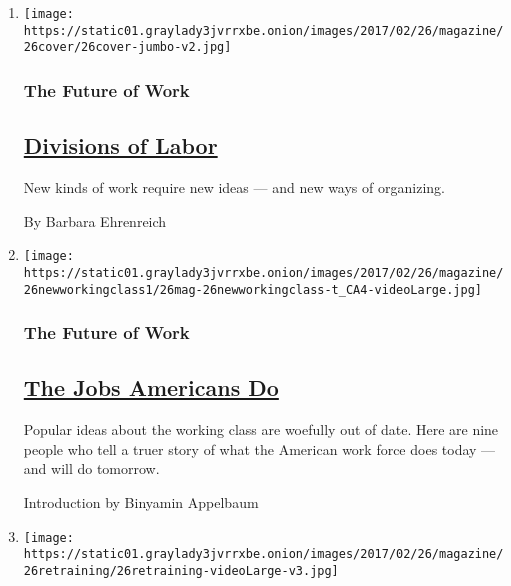 \begin{enumerate}
\def\labelenumi{\arabic{enumi}.}
\item
  \texttt{[image: https://static01.graylady3jvrrxbe.onion/images/2017/02/26/magazine/26cover/26cover-jumbo-v2.jpg]}

  \hypertarget{the-future-of-work}{%
  \subsubsection{The Future of Work}\label{the-future-of-work}}

  \hypertarget{divisions-of-labor}{%
  \subsection{\texorpdfstring{\href{/2017/02/23/magazine/american-working-class-future.html}{Divisions
  of Labor}}{Divisions of Labor}}\label{divisions-of-labor}}

  New kinds of work require new ideas --- and new ways of organizing.

  By Barbara Ehrenreich
\item
  \texttt{[image: https://static01.graylady3jvrrxbe.onion/images/2017/02/26/magazine/26newworkingclass1/26mag-26newworkingclass-t\_CA4-videoLarge.jpg]}

  \hypertarget{the-future-of-work-1}{%
  \subsubsection{The Future of Work}\label{the-future-of-work-1}}

  \hypertarget{the-jobs-americans-do}{%
  \subsection{\texorpdfstring{\href{/2017/02/23/magazine/the-new-working-class.html}{The
  Jobs Americans
  Do}}{The Jobs Americans Do}}\label{the-jobs-americans-do}}

  Popular ideas about the working class are woefully out of date. Here
  are nine people who tell a truer story of what the American work force
  does today --- and will do tomorrow.

  Introduction by Binyamin Appelbaum
\item
  \texttt{[image: https://static01.graylady3jvrrxbe.onion/images/2017/02/26/magazine/26retraining/26retraining-videoLarge-v3.jpg]}

  \hypertarget{the-future-of-work-2}{%
}
\end{enumerate}
